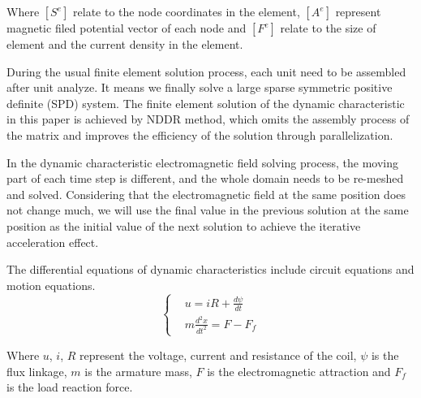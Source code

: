 \documentclass[journal,transmag]{IEEEtran}
\begin{document}
Where $[S^e]$ relate to the node coordinates in the element, $[A^e]$ represent magnetic filed potential vector of each node and $[F^e]$ relate to the size of element and the current density in the element.

During the usual finite element solution process, each unit need to be assembled after unit analyze. It means we finally solve a large sparse symmetric positive definite (SPD) system. The finite element solution of the dynamic characteristic in this paper is achieved by NDDR method, which omits the assembly process of the matrix and improves the efficiency of the solution through parallelization.

In the dynamic characteristic electromagnetic field solving process, the moving part of each time step is different, and the whole domain needs to be re-meshed and solved. Considering that the electromagnetic field at the same position does not change much, we will use the final value in the previous solution at the same position as the initial value of the next solution to achieve the iterative acceleration effect.

The differential equations of dynamic characteristics include circuit equations and motion equations.
\begin{equation}
\left\{ 
\begin{aligned}
&u = iR + \frac{{d\psi }}{{dt}}\\
&m\frac{{{d^2}x}}{{d{t^2}}} = F - {F_f}
\end{aligned} 
\right.
\label{dynamic}
\end{equation}

Where $u$, $i$, $R$ represent the voltage, current and resistance of the coil, $\psi$ is the flux linkage, $m$ is the armature mass, $F$ is the electromagnetic attraction and $F_f$ is the load reaction force.
\end{document}
